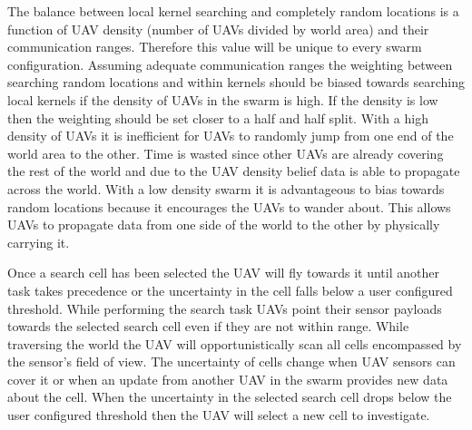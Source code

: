 The balance between local kernel searching and completely random locations is a function of UAV density (number of UAVs divided by world area) and their communication ranges.  Therefore this value will be unique to every swarm configuration.  Assuming adequate communication ranges the weighting between searching random locations and within kernels should be biased towards searching local kernels if the density of UAVs  in the swarm is high.  If the density is low then the weighting should be set closer to a half and half split.  With a high density of UAVs it is inefficient for UAVs to randomly jump from one end of the world area to the other.  Time is wasted since other UAVs are already covering the rest of the world and due to the UAV density belief data is able to propagate across the world.  With a low density swarm it is advantageous to bias towards random locations because it encourages the UAVs to wander about.  This allows UAVs to propagate data from one side of the world to the other by physically carrying it.  



Once a search cell has been selected the UAV will fly towards it until another task takes precedence or the uncertainty in the cell falls below a user configured threshold.  While performing the search task UAVs point their sensor payloads towards the selected search cell even if they are not within range.  While traversing the world the UAV will opportunistically scan all cells encompassed by the sensor's field of view.  The uncertainty of cells change when UAV sensors can cover it or when an update from another UAV in the swarm provides new data about the cell. When the uncertainty in the selected search cell drops below the user configured threshold then the UAV will select a new cell to investigate.  

